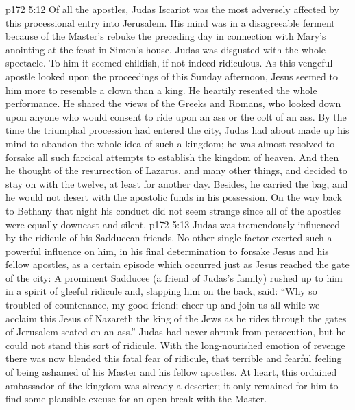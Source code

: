 \vs p172 5:12 Of all the apostles, Judas Iscariot was the most adversely affected by this processional entry into Jerusalem. His mind was in a disagreeable ferment because of the Master’s rebuke the preceding day in connection with Mary’s anointing at the feast in Simon’s house. Judas was disgusted with the whole spectacle. To him it seemed childish, if not indeed ridiculous. As this vengeful apostle looked upon the proceedings of this Sunday afternoon, Jesus seemed to him more to resemble a clown than a king. He heartily resented the whole performance. He shared the views of the Greeks and Romans, who looked down upon anyone who would consent to ride upon an ass or the colt of an ass. By the time the triumphal procession had entered the city, Judas had about made up his mind to abandon the whole idea of such a kingdom; he was almost resolved to forsake all such farcical attempts to establish the kingdom of heaven. And then he thought of the resurrection of Lazarus, and many other things, and decided to stay on with the twelve, at least for another day. Besides, he carried the bag, and he would not desert with the apostolic funds in his possession. On the way back to Bethany that night his conduct did not seem strange since all of the apostles were equally downcast and silent.
\vs p172 5:13 Judas was tremendously influenced by the ridicule of his Sadducean friends. No other single factor exerted such a powerful influence on him, in his final determination to forsake Jesus and his fellow apostles, as a certain episode which occurred just as Jesus reached the gate of the city: A prominent Sadducee (a friend of Judas’s family) rushed up to him in a spirit of gleeful ridicule and, slapping him on the back, said: “Why so troubled of countenance, my good friend; cheer up and join us all while we acclaim this Jesus of Nazareth the king of the Jews as he rides through the gates of Jerusalem seated on an ass.” Judas had never shrunk from persecution, but he could not stand this sort of ridicule. With the long\hyp{}nourished emotion of revenge there was now blended this fatal fear of ridicule, that terrible and fearful feeling of being ashamed of his Master and his fellow apostles. At heart, this ordained ambassador of the kingdom was already a deserter; it only remained for him to find some plausible excuse for an open break with the Master.\plusone
